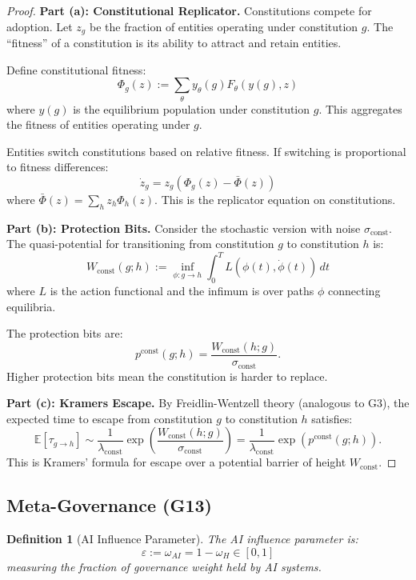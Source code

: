 \documentclass[12pt]{article}
\newtheorem{definition}[theorem]{Definition}
\newcommand{\E}{\mathbb{E}}
\begin{document}
\begin{proof}
\textbf{Part (a): Constitutional Replicator.}
Constitutions compete for adoption. Let $z_g$ be the fraction of entities operating under constitution $g$. The ``fitness'' of a constitution is its ability to attract and retain entities.

Define constitutional fitness:
\[
\Phi_g(z) := \sum_\theta y_\theta(g) F_\theta(y(g), z)
\]
where $y(g)$ is the equilibrium population under constitution $g$. This aggregates the fitness of entities operating under $g$.

Entities switch constitutions based on relative fitness. If switching is proportional to fitness differences:
\[
\dot{z}_g = z_g (\Phi_g(z) - \bar{\Phi}(z))
\]
where $\bar{\Phi}(z) = \sum_h z_h \Phi_h(z)$. This is the replicator equation on constitutions.

\textbf{Part (b): Protection Bits.}
Consider the stochastic version with noise $\sigma_{\text{const}}$. The quasi-potential for transitioning from constitution $g$ to constitution $h$ is:
\[
W_{\text{const}}(g; h) := \inf_{\phi: g \to h} \int_0^T L(\phi(t), \dot{\phi}(t)) \, dt
\]
where $L$ is the action functional and the infimum is over paths $\phi$ connecting equilibria.

The protection bits are:
\[
p^{\text{const}}(g; h) = \frac{W_{\text{const}}(h; g)}{\sigma_{\text{const}}}.
\]
Higher protection bits mean the constitution is harder to replace.

\textbf{Part (c): Kramers Escape.}
By Freidlin-Wentzell theory (analogous to G3), the expected time to escape from constitution $g$ to constitution $h$ satisfies:
\[
\E[\tau_{g \to h}] \sim \frac{1}{\lambda_{\text{const}}} \exp\left( \frac{W_{\text{const}}(h; g)}{\sigma_{\text{const}}} \right) = \frac{1}{\lambda_{\text{const}}} \exp(p^{\text{const}}(g; h)).
\]
This is Kramers' formula for escape over a potential barrier of height $W_{\text{const}}$.
\end{proof}

\subsection{Meta-Governance (G13)}

\begin{definition}[AI Influence Parameter]
The \emph{AI influence parameter} is:
\[
\varepsilon := \omega_{AI} = 1 - \omega_H \in [0, 1]
\]
measuring the fraction of governance weight held by AI systems.
\end{definition}
\end{document}
